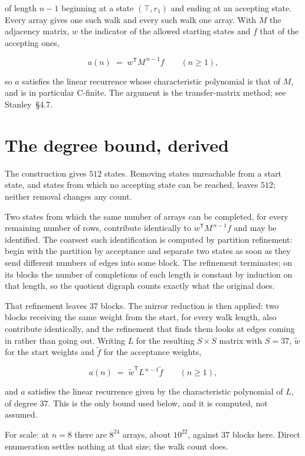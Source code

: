\documentclass[11pt]{article}
\theoremstyle{definition}
\begin{document}
of length $n-1$ beginning at a state $(\top,r_1)$ and ending at an accepting state. Every array gives one such walk and every such walk one array. With $M$ the adjacency matrix, $w$ the indicator of the allowed starting states and $f$ that of the accepting ones,

\[a(n) \;=\; w^{\mathsf T} M^{\,n-1} f \qquad (n \ge 1),\]

so $a$ satisfies the linear recurrence whose characteristic polynomial is that of $M$, and is in particular C-finite. The argument is the transfer-matrix method; see Stanley~\S4.7.

\section{The degree bound, derived}

The construction gives $512$ states. Removing states unreachable from a start state, and states from which no accepting state can be reached, leaves $512$; neither removal changes any count.

Two states from which the same number of arrays can be completed, for every remaining number of rows, contribute identically to $w^{\mathsf T}M^{\,n-1}f$ and may be identified. The coarsest such identification is computed by partition refinement: begin with the partition by acceptance and separate two states as soon as they send different numbers of edges into some block. The refinement terminates; on its blocks the number of completions of each length is constant by induction on that length, so the quotient digraph counts exactly what the original does.

That refinement leaves $37$ blocks. The mirror reduction is then applied: two blocks receiving the same weight from the start, for every walk length, also contribute identically, and the refinement that finds them looks at edges coming in rather than going out. Writing $L$ for the resulting $S \times S$ matrix with $S = 37$, $\tilde w$ for the start weights and $\tilde f$ for the acceptance weights,

\[a(n) \;=\; \tilde w^{\mathsf T} L^{\,n-1} \tilde f \qquad (n \ge 1),\]

and $a$ satisfies the linear recurrence given by the characteristic polynomial of $L$, of degree $37$. This is the only bound used below, and it is computed, not assumed.

For scale: at $n = 8$ there are $8^{24}$ arrays, about $10^{22}$, against $37$ blocks here. Direct enumeration settles nothing at that size; the walk count does.
\end{document}
